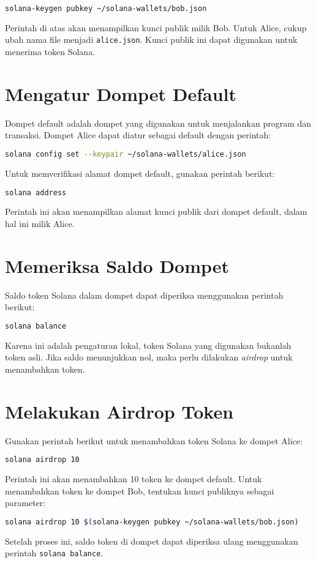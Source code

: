 \begin{lstlisting}[language=bash]
	solana-keygen pubkey ~/solana-wallets/bob.json
\end{lstlisting}

Perintah di atas akan menampilkan kunci publik milik Bob. Untuk Alice, cukup ubah nama file menjadi \texttt{alice.json}. Kunci publik ini dapat digunakan untuk menerima token Solana.

\section{Mengatur Dompet Default}
Dompet default adalah dompet yang digunakan untuk menjalankan program dan transaksi. Dompet Alice dapat diatur sebagai default dengan perintah:

\begin{lstlisting}[language=bash]
	solana config set --keypair ~/solana-wallets/alice.json
\end{lstlisting}

Untuk memverifikasi alamat dompet default, gunakan perintah berikut:

\begin{lstlisting}[language=bash]
	solana address
\end{lstlisting}

Perintah ini akan menampilkan alamat kunci publik dari dompet default, dalam hal ini milik Alice.

\section{Memeriksa Saldo Dompet}
Saldo token Solana dalam dompet dapat diperiksa menggunakan perintah berikut:

\begin{lstlisting}[language=bash]
	solana balance
\end{lstlisting}

Karena ini adalah pengaturan lokal, token Solana yang digunakan bukanlah token asli. Jika saldo menunjukkan nol, maka perlu dilakukan \textit{airdrop} untuk menambahkan token.

\section{Melakukan Airdrop Token}
Gunakan perintah berikut untuk menambahkan token Solana ke dompet Alice:

\begin{lstlisting}[language=bash]
	solana airdrop 10
\end{lstlisting}

Perintah ini akan menambahkan 10 token ke dompet default. Untuk menambahkan token ke dompet Bob, tentukan kunci publiknya sebagai parameter:

\begin{lstlisting}[language=bash]
	solana airdrop 10 $(solana-keygen pubkey ~/solana-wallets/bob.json)
\end{lstlisting}

Setelah proses ini, saldo token di dompet dapat diperiksa ulang menggunakan perintah \texttt{solana balance}.
